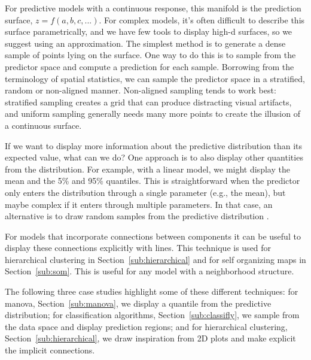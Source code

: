 \documentclass[preprint]{imsart}
\begin{document}

For predictive models with a continuous response, this manifold is the prediction surface, $z = f(a,b,c, ...)$. For complex models, it's often difficult to describe this surface parametrically, and we have few tools to display high-d surfaces, so we suggest using an approximation. The simplest method is to generate a dense sample of points lying on the surface. One way to do this is to sample from the predictor space and compute a prediction for each sample. Borrowing from the terminology of spatial statistics, we can sample the predictor space in a stratified, random or non-aligned manner. Non-aligned sampling tends to work best: stratified sampling creates a grid that can produce distracting visual artifacts, and uniform sampling generally needs many more points to create the illusion of a continuous surface.

If we want to display more information about the predictive distribution than its expected value, what can we do? One approach is to also display other quantities from the distribution. For example, with a linear model, we might display the mean and the 5\% and 95\% quantiles. This is straightforward when the predictor only enters the distribution through a single parameter (e.g., the mean), but maybe complex if it enters through multiple parameters. In that case, an alternative is to draw random samples from the predictive distribution \citep{gelman:2006}.

For models that incorporate connections between components it can be useful to display these connections explicitly with lines. This technique is used for hierarchical clustering in Section~\ref{sub:hierarchical} and for self organizing maps in Section~\ref{sub:som}. This is useful for any model with a neighborhood structure.

The following three case studies highlight some of these different techniques: for {\sc manova}, Section~\ref{sub:manova}, we display a quantile from the predictive distribution; for classification algorithms, Section~\ref{sub:classifly}, we sample from the data space and display prediction regions; and for hierarchical clustering, Section~\ref{sub:hierarchical}, we draw inspiration from 2D plots and make explicit the implicit connections.
\end{document}

